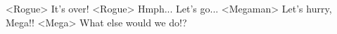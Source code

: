 <Rogue> It's over! 
<Rogue> Hmph... Let's go... 
<Megaman> Let's hurry, Mega!! 
<Mega> What else would we do!? 
